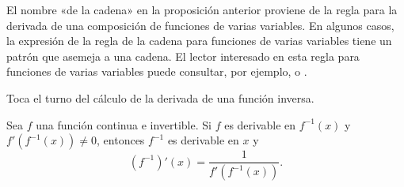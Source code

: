 \documentclass[12pt,a4paper]{book}
\begin{document}
    El nombre «de la cadena» en la proposición anterior proviene de la regla
    para la derivada de una composición de funciones de varias variables. En
    algunos casos, la expresión de la regla de la cadena para funciones de varias
    variables tiene un patrón que asemeja a una cadena. El lector interesado en
    esta regla para funciones de varias variables puede consultar, por ejemplo, \cite{apostol1974}
    o \cite{nunez2020calculoIII}.

    Toca el turno del cálculo de la derivada de una función inversa.

    \begin{proposicion}\label{prop:62}
        Sea $f$ una función
        continua e invertible. Si $f$ es derivable en $f^{-1}(x)$ y $f'\left(f^{-1}(x)\right)\neq 0$, entonces
        $f^{-1}$ es derivable en $x$ y
        \begin{equation*}
            \left(f^{-1}\right)'(x)=\frac{1}{f'\left(f^{-1}(x)\right)}.
        \end{equation*}
    \end{proposicion}
\end{document}
